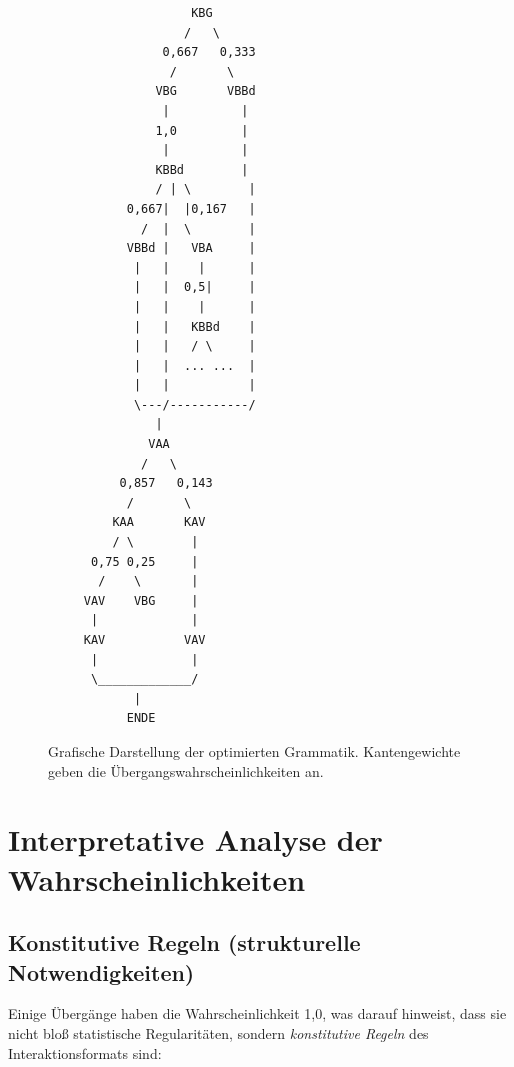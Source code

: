 \documentclass[12pt,a4paper]{article}
\begin{document}
\begin{figure}[H]
\centering
\begin{verbatim}
                    KBG
                   /   \
                0,667   0,333
                 /       \
               VBG       VBBd
                |          |
               1,0         |
                |          |
               KBBd        |
               / | \        |
           0,667|  |0,167   |
             /  |  \        |
           VBBd |   VBA     |
            |   |    |      |
            |   |  0,5|     |
            |   |    |      |
            |   |   KBBd    |
            |   |   / \     |
            |   |  ... ...  |
            |   |           |
            \---/-----------/
               |
              VAA
             /   \
          0,857   0,143
           /       \
         KAA       KAV
         / \        |
      0,75 0,25     |
       /    \       |
     VAV    VBG     |
      |             |
     KAV           VAV
      |             |
      \_____________/
            |
           ENDE
\end{verbatim}
\caption{Grafische Darstellung der optimierten Grammatik. Kantengewichte
geben die Übergangswahrscheinlichkeiten an.}
\label{fig:grammar}
\end{figure}

\section{Interpretative Analyse der Wahrscheinlichkeiten}

\subsection{Konstitutive Regeln (strukturelle Notwendigkeiten)}

Einige Übergänge haben die Wahrscheinlichkeit 1,0, was darauf hinweist, dass
sie nicht bloß statistische Regularitäten, sondern \textit{konstitutive Regeln}
des Interaktionsformats sind:
\end{document}
